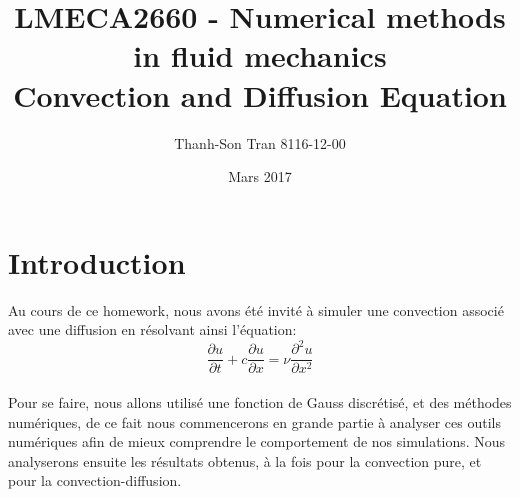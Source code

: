 \documentclass{article}
\title{ LMECA2660 - Numerical methods in fluid mechanics \\ Convection and Diffusion Equation}
\author{ Thanh-Son Tran       8116-12-00}
\date{Mars 2017}
\begin{document}
\maketitle
\section{Introduction}
Au cours de ce homework, nous avons été invité à simuler une convection associé avec une diffusion en résolvant ainsi l'équation:\\
\begin{equation}
    \frac{\partial u}{\partial t} + c \frac{\partial u}{\partial x} =  \nu \frac{\partial^2 u}{\partial x^2}
\end{equation}
\\
Pour se faire, nous allons utilisé une fonction de Gauss discrétisé, et des méthodes numériques, de ce fait nous commencerons en grande partie à analyser ces outils numériques afin de mieux comprendre le comportement de nos simulations.
Nous analyserons ensuite les résultats obtenus, à la fois pour la convection pure, et pour la convection-diffusion.
\end{document}

